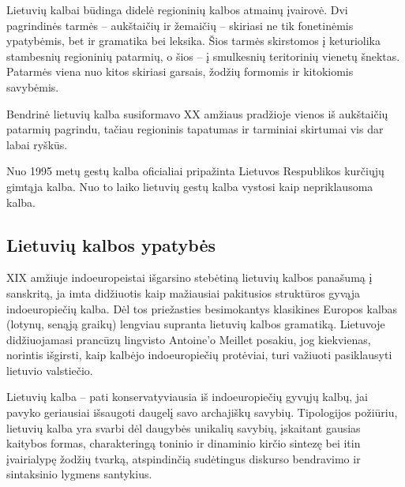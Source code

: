 \begin{multicols}{2}
Lietuvių kalbai būdinga didelė regioninių kalbos atmainų įvairovė. Dvi pagrindinės tarmės – aukštaičių ir žemaičių – skiriasi ne tik fonetinėmis ypatybėmis, bet ir gramatika bei leksika. Šios tarmės skirstomos į keturiolika stambesnių regioninių patarmių, o šios – į smulkesnių teritorinių vienetų šnektas. Patarmės viena nuo kitos skiriasi garsais, žodžių formomis ir kitokiomis savybėmis.

Bendrinė lietuvių kalba susiformavo XX amžiaus pradžioje vienos iš aukštaičių patarmių pagrindu, tačiau regioninis tapatumas ir tarminiai skirtumai vis dar labai ryškūs.

Nuo 1995 metų gestų kalba oficialiai pripažinta Lietuvos Respublikos kurčiųjų gimtąja kalba. Nuo to laiko lietuvių gestų kalba vystosi kaip nepriklausoma kalba.

\subsection{Lietuvių kalbos ypatybės}

 XIX amžiuje indoeuropeistai išgarsino stebėtiną lietuvių kalbos panašumą į sanskritą, ja imta didžiuotis kaip mažiausiai pakitusios struktūros gyvąja indoeuropiečių kalba. Dėl tos priežasties besimokantys klasikines Europos kalbas (lotynų, senąją graikų) lengviau supranta lietuvių kalbos gramatiką. Lietuvoje didžiuojamasi prancūzų lingvisto Antoine’o Meillet posakiu, jog kiekvienas, norintis išgirsti, kaip kalbėjo indoeuropiečių protėviai, turi važiuoti pasiklausyti lietuvio valstiečio.

Lietuvių kalba – pati konservatyviausia iš indoeuropiečių gyvųjų kalbų, jai pavyko geriausiai išsaugoti daugelį savo archajiškų savybių. Tipologijos požiūriu, lietuvių kalba yra svarbi dėl daugybės unikalių savybių, įskaitant gausias kaitybos formas, charakteringą toninio ir dinaminio kirčio sintezę bei itin įvairialypę žodžių tvarką, atspindinčią sudėtingus diskurso bendravimo ir sintaksinio lygmens santykius.


\end{multicols}
